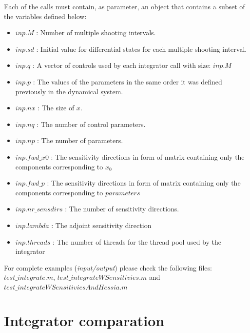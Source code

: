 \documentclass[12pt, letterpaper]{article}
\begin{document}
Each of the calls must contain, as parameter, an object that contains a subset of the variables defined below:

\begin{itemize} 
	\item $inp.M$ : Number of  multiple shooting intervals. 

	\item $inp.sd$ : Initial value for differential states for each multiple shooting interval.
	
	\item $inp.q$ : A vector of controls used by each integrator call with size: $inp.M$

	\item $inp.p$ : The values of the parameters in the same order it was defined previously in the dynamical system.


	\item $inp.nx$ : The size of $x$.
	\item $inp.nq$ : The number of control parameters.
	\item $inp.np$ : The number of parameters.
	\item $inp.fwd\_x0$ : The sensitivity directions in form of matrix containing only the components corresponding to $x_0$
	\item $inp.fwd\_p$ : The sensitivity directions in form of matrix containing only the components corresponding to $parameters$
	\item $inp.nr\_sensdirs$ : The number of sensitivity directions.
	\item $inp.lambda$ : The adjoint sensitivity direction
	\item $inp.threads$ : The number of threads for the thread pool used by the integrator
\end{itemize}

For complete examples (\textit{input/output}) please check the following files: $test\_integrate.m$, $test\_integrateWSensitivies.m$ and \\
$test\_integrateWSensitiviesAndHessia.m$




\section{Integrator comparation}
\label{Integrator_comparation}
\end{document}
